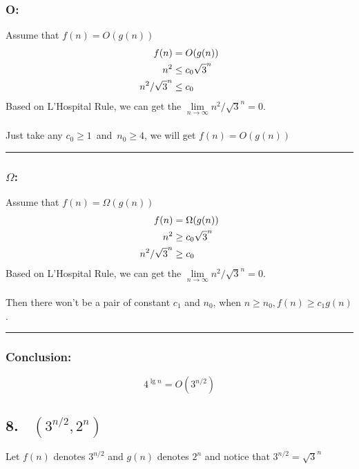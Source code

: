 \documentclass[oneside]{homework} %
\begin{document}
\subsubsection* {O:}
Assume that $f(n) = O(g(n))$\\
\begin{equation}
\notag
\begin{aligned}[b]
f(n) &= O(g(n)) \\
n^2  & \leq c_{0}\sqrt{3}^n \\
n^2 / \sqrt{3}^n & \leq c_{0} \\
\end{aligned}
\end{equation}
Based on L'Hospital Rule, we can get the $\lim\limits_{n\to\infty}{n^2 / \sqrt{3}^n}  = 0$.\\
\\ Just take any $ c_{0} \geq 1 $~and~$n_{0}\geq 4$, we will get $f(n) = O(g(n))$ 
\\ \rule{3mm}{3mm}

\subsubsection* {$\Omega$:}
Assume that $f(n) = \Omega (g(n))$\\
\begin{equation}
\notag
\begin{aligned}[b]
f(n) &= \Omega(g(n)) \\
n^2  & \geq c_{0}\sqrt{3}^n \\
n^2 / \sqrt{3}^n & \geq c_{0} \\
\end{aligned}
\end{equation}
Based on L'Hospital Rule, we can get the $\lim\limits_{n\to\infty}{n^2 / \sqrt{3}^n}  = 0$.\\
\\Then there won't be a pair of constant $c_{1}$ and $n_{0}$, when $n \geq n_{0} , f(n) \geq c_{1}g(n) $.
\\ \rule{3mm}{3mm}

\subsubsection* {Conclusion:}
$$4^{\lg n} = O(3^{n/2})$$

\subsection*{8. ~$(3^{n/2},2^n)$}
Let $f(n)$ denotes $3^{n/2}$ and $g(n)$ denotes $2^n$ and notice that $3^{n/2} = \sqrt{3}^n$
\end{document}
